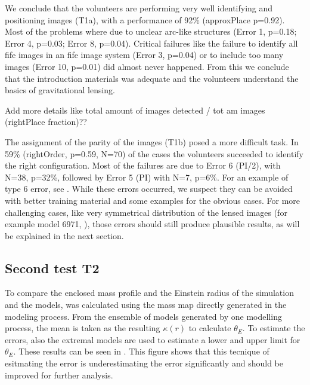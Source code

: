 


We conclude that the volunteers are performing very well identifying and positioning images (T1a), with a performance of 92\% (approxPlace p=0.92).
Most of the problems where due to unclear arc-like structures (Error 1, p=0.18; Error 4, p=0.03; Error 8, p=0.04).
Critical failures like the failure to identify all fife images in an fife image system (Error 3, p=0.04) or to include too many images (Error 10, p=0.01) did almost never happened.
From this we conclude that the introduction materials was adequate and the volunteers understand the basics of gravitational lensing.

 Add more details like total amount of images detected / tot am images (rightPlace fraction)??

The assignment of the parity of the images (T1b) posed a more difficult task.
In 59\% (rightOrder, p=0.59, N=70) of the cases the volunteers succeeded to identify the right configuration.
Most of the failures are due to Error 6 (PI/2), with N=38, p=32\%, followed by Error 5 (PI) with N=7, p=6\%.
For an example of type 6 error, see .
While these errors occurred, we suspect they can be avoided with better training material and some examples for the obvious cases.
For more challenging cases, like very symmetrical distribution of the lensed images (for example model 6971, ), those errors should still produce plausible results, as will be explained in the next section.







\subsection{Second test T2} \label{sec:results.2}

To compare the enclosed mass profile and the Einstein radius of the simulation and the models, \kenc was calculated using the mass map \kap[x,y] directly generated in the modeling process.
From the ensemble of models generated by one modelling process, the mean is taken as the resulting $\kappa(r)$ to calculate $\theta_E$.
To estimate the errors, also the extremal models are used to estimate a lower and upper limit for $\theta_E$.
These results can be seen in .
This figure shows that this tecnique of esitmating the error is underestimating the error significantly and should be improved for further analysis.

